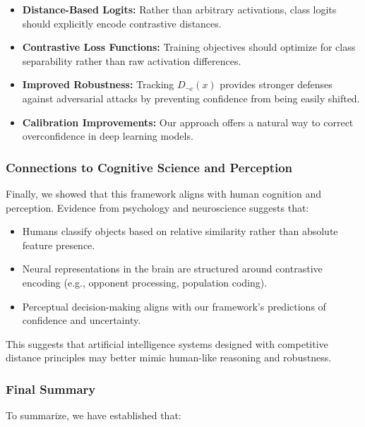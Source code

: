 \documentclass[12pt]{article}
\begin{document}
\begin{itemize}
    \item \textbf{Distance-Based Logits:} Rather than arbitrary activations, class logits should explicitly encode contrastive distances.
    \item \textbf{Contrastive Loss Functions:} Training objectives should optimize for class separability rather than raw activation differences.
    \item \textbf{Improved Robustness:} Tracking \( D_{\neg c}(x) \) provides stronger defenses against adversarial attacks by preventing confidence from being easily shifted.
    \item \textbf{Calibration Improvements:} Our approach offers a natural way to correct overconfidence in deep learning models.
\end{itemize}

\subsubsection{Connections to Cognitive Science and Perception}

Finally, we showed that this framework aligns with human cognition and perception. Evidence from psychology and neuroscience suggests that:

\begin{itemize}
    \item Humans classify objects based on relative similarity rather than absolute feature presence.
    \item Neural representations in the brain are structured around contrastive encoding (e.g., opponent processing, population coding).
    \item Perceptual decision-making aligns with our framework’s predictions of confidence and uncertainty.
\end{itemize}

This suggests that artificial intelligence systems designed with competitive distance principles may better mimic human-like reasoning and robustness.

\subsubsection{Final Summary}

To summarize, we have established that:
\end{document}
